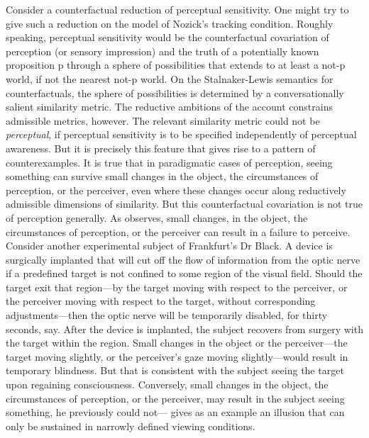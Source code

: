 \documentclass[12pt]{article}
\begin{document}
Consider a counterfactual reduction of perceptual sensitivity. One might try to give such a reduction on the model of Nozick's \citeyearpar{Nozick:1981fk} tracking condition. Roughly speaking, perceptual sensitivity would be the counterfactual covariation of perception (or sensory impression) and the truth of a potentially known proposition p through a sphere of possibilities that extends to at least a not-p world, if not the nearest not-p world. On the Stalnaker-Lewis semantics for counterfactuals, the sphere of possibilities is determined by a conversationally salient similarity metric. The reductive ambitions of the account constrains admissible metrics, however. The relevant similarity metric could not be \emph{perceptual}, if perceptual sensitivity is to be specified independently of perceptual awareness. But it is precisely this feature that gives rise to a pattern of counterexamples. It is true that in paradigmatic cases of perception, seeing something can survive small changes in the object, the circumstances of perception, or the perceiver, even where these changes occur along reductively admissible dimensions of similarity. But this counterfactual covariation is not true of perception generally.  As \citet{Johnston:2006uq} observes, small changes, in the object, the circumstances of perception, or the perceiver can result in a failure to perceive. Consider another experimental subject of Frankfurt's \citeyearpar{Frankfurt:1969kx} Dr Black. A device is surgically implanted that will cut off the flow of information from the optic nerve if a predefined target is not confined to some region of the visual field. Should the target exit that region---by the target moving with respect to the perceiver, or the perceiver moving with respect to the target, without corresponding adjustments---then the optic nerve will be temporarily disabled, for thirty seconds, say. After the device is implanted, the subject recovers from surgery with the target within the region. Small changes in the object or the perceiver---the target moving slightly, or the perceiver's gaze moving slightly---would result in temporary blindness. But that is consistent with the subject seeing the target upon regaining consciousness. Conversely, small changes in the object, the circumstances of perception, or the perceiver, may result in the subject seeing something, he previously could not---\citet{Johnston:2006uq} gives as an example an illusion that can only be sustained in narrowly defined viewing conditions. 
\end{document}
